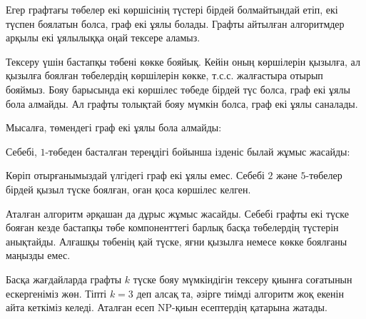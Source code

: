
Егер графтағы төбелер екі көршісінің түстері бірдей болмайтындай етіп, екі түспен боялатын болса, граф екі ұялы болады. Графты айтылған алгоритмдер 
арқылы екі ұялылыққа оңай тексере аламыз.

Тексеру үшін бастапқы төбені көкке бояйық. Кейін оның
көршілерін қызылға, ал қызылға боялған төбелердің көршілерін көкке, т.с.с. жалғастыра отырып бояймыз.
Бояу барысында екі көршілес төбеде бірдей түс болса, граф екі ұялы бола алмайды. Ал графты толықтай бояу мүмкін болса, граф екі ұялы саналады.

Мысалға, төмендегі граф екі ұялы бола алмайды:
\begin{center}
\end{center}
Себебі, $1$-төбеден басталған тереңдігі бойынша ізденіс
былай жұмыс жасайды:
\begin{center}
\end{center}
Көріп отырғанымыздай үлгідегі граф екі ұялы емес. Себебі $2$ және $5$-төбелер
бірдей қызыл түске боялған, оған қоса көршілес келген.

Аталған алгоритм әрқашан да дұрыс жұмыс жасайды. Себебі графты екі түске бояған
кезде бастапқы төбе компоненттегі барлық басқа төбелердің
түстерін анықтайды.
Алғашқы төбенің қай түске, яғни қызылға немесе көкке боялғаны маңызды емес.

Басқа жағдайларда графты $k$ түске бояу мүмкіндігін тексеру
қиынға соғатынын ескергеніміз жөн. Тіпті $k=3$ деп алсақ та, әзірге тиімді алгоритм жоқ екенін айта кеткіміз келеді. 
Аталған есеп NP-қиын есептердің қатарына жатады.
